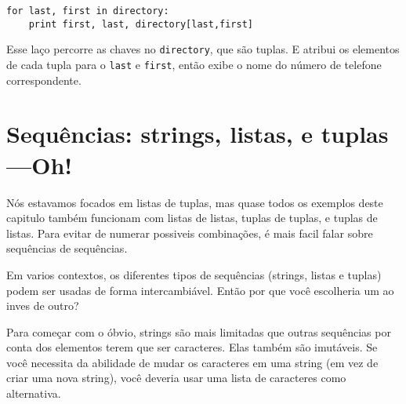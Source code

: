 
\beforeverb
\begin{verbatim}
for last, first in directory:
    print first, last, directory[last,first]
\end{verbatim}
\afterverb
%
Esse laço percorre as chaves no {\tt directory}, que são tuplas. E
atribui os elementos de cada tupla para o {\tt last} e {\tt first},
então exibe o nome do número de telefone correspondente.

\section{Sequências: strings, listas, e tuplas---Oh!}

Nós estavamos focados em listas de tuplas, mas quase todos os exemplos
deste capitulo também funcionam com listas de listas, tuplas de tuplas,
e tuplas de listas. Para evitar de numerar possiveis combinações, é
mais facil falar sobre sequências de sequências.

Em varios contextos, os diferentes tipos de sequências (strings, listas e
tuplas) podem ser usadas de forma intercambiável. Então por que você
escolheria um ao inves de outro?


Para começar com o óbvio, strings são mais limitadas que outras
sequências por conta dos elementos terem que ser caracteres. Elas
também são imutáveis. Se você necessita da abilidade de mudar os
caracteres em uma string (em vez de criar uma nova string), você 
deveria usar uma lista de caracteres como alternativa.

